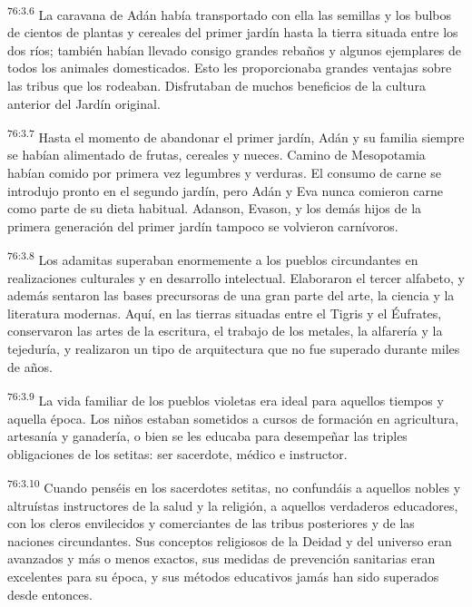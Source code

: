 \par
\textsuperscript{76:3.6} La caravana de Adán había transportado con ella las semillas y los bulbos de cientos de plantas y cereales del primer jardín hasta la tierra situada entre los dos ríos; también habían llevado consigo grandes rebaños y algunos ejemplares de todos los animales domesticados. Esto les proporcionaba grandes ventajas sobre las tribus que los rodeaban. Disfrutaban de muchos beneficios de la cultura anterior del Jardín original.

\par
\textsuperscript{76:3.7} Hasta el momento de abandonar el primer jardín, Adán y su familia siempre se habían alimentado de frutas, cereales y nueces. Camino de Mesopotamia habían comido por primera vez legumbres y verduras. El consumo de carne se introdujo pronto en el segundo jardín, pero Adán y Eva nunca comieron carne como parte de su dieta habitual. Adanson, Evason, y los demás hijos de la primera generación del primer jardín tampoco se volvieron carnívoros.

\par
\textsuperscript{76:3.8} Los adamitas superaban enormemente a los pueblos circundantes en realizaciones culturales y en desarrollo intelectual. Elaboraron el tercer alfabeto, y además sentaron las bases precursoras de una gran parte del arte, la ciencia y la literatura modernas. Aquí, en las tierras situadas entre el Tigris y el Éufrates, conservaron las artes de la escritura, el trabajo de los metales, la alfarería y la tejeduría, y realizaron un tipo de arquitectura que no fue superado durante miles de años.

\par
\textsuperscript{76:3.9} La vida familiar de los pueblos violetas era ideal para aquellos tiempos y aquella época. Los niños estaban sometidos a cursos de formación en agricultura, artesanía y ganadería, o bien se les educaba para desempeñar las triples obligaciones de los setitas: ser sacerdote, médico e instructor.

\par
\textsuperscript{76:3.10} Cuando penséis en los sacerdotes setitas, no confundáis a aquellos nobles y altruístas instructores de la salud y la religión, a aquellos verdaderos educadores, con los cleros envilecidos y comerciantes de las tribus posteriores y de las naciones circundantes. Sus conceptos religiosos de la Deidad y del universo eran avanzados y más o menos exactos, sus medidas de prevención sanitarias eran excelentes para su época, y sus métodos educativos jamás han sido superados desde entonces.

